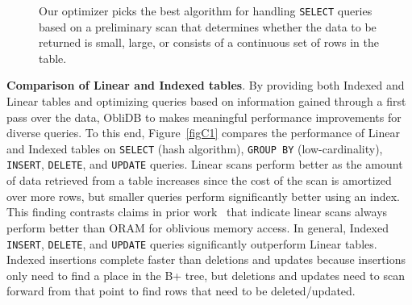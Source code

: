 \documentclass[letterpaper,twocolumn,10pt]{article}
\def\name/{ObliDB}
\begin{document}
\begin{figure}
\small
\centering
{}
\caption{Our optimizer picks the best algorithm for handling \texttt{SELECT} queries based on a preliminary scan that determines whether the data to be returned is small, large, or consists of a continuous set of rows in the table.}
\label{figC3}
\end{figure}
\noindent \textbf{Comparison of Linear and Indexed tables}.
By providing both Indexed and Linear tables and optimizing queries based on information gained through a first pass over the data, \name/ to makes meaningful performance improvements for diverse queries. To this end, Figure~\ref{figC1} compares the performance of Linear and Indexed tables on \texttt{SELECT} (hash algorithm), \texttt{GROUP BY} (low-cardinality), \texttt{INSERT}, \texttt{DELETE}, and \texttt{UPDATE} queries. Linear scans perform better as the amount of data retrieved from a table increases since the cost of the scan is amortized over more rows, but smaller queries perform significantly better using an index. This finding contrasts claims in prior work~\cite{RLT15} that indicate linear scans always perform better than ORAM for oblivious memory access. In general, Indexed \texttt{INSERT}, \texttt{DELETE}, and \texttt{UPDATE} queries significantly outperform Linear tables. Indexed insertions complete faster than deletions and updates because insertions only need to find a place in the B+ tree, but deletions and updates need to scan forward from that point to find rows that need to be deleted/updated.
\end{document}
